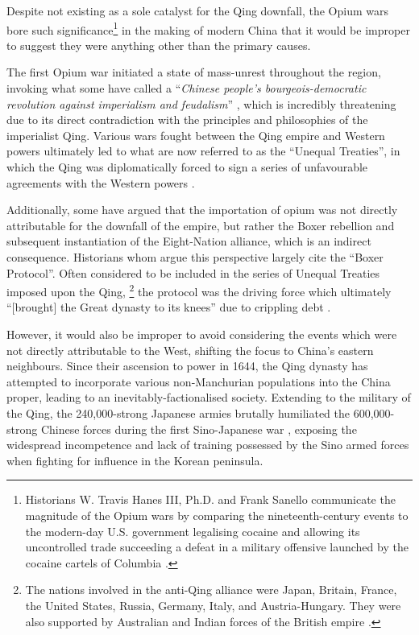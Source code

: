 \documentclass{article}
\begin{document}
Despite not existing as a sole catalyst for the Qing downfall, the Opium wars bore such significance\footnote{Historians W. Travis Hanes III, Ph.D. and Frank Sanello communicate the magnitude of the Opium wars by comparing the nineteenth-century events to the modern-day U.S. government legalising cocaine and allowing its uncontrolled trade succeeding a defeat in a military offensive launched by the cocaine cartels of Columbia
\autocite{Hanes:2004}.} in the making of modern China that it would be improper to suggest they were anything other than the primary causes.

The first Opium war initiated a state of mass-unrest throughout the region, invoking what some have called a ``\textit{Chinese people's bourgeois-democratic revolution against imperialism and feudalism}''
\autocite{Janin:1999}, which is incredibly threatening due to its direct contradiction with the principles and philosophies of the imperialist Qing. Various wars fought between the Qing empire and Western powers ultimately led to what are now referred to as the ``Unequal Treaties'', in which the Qing was diplomatically forced to sign a series of unfavourable agreements with the Western powers \autocite{Wang:2005}.

Additionally, some have argued that the importation of opium was not directly attributable for the downfall of the empire, but rather the Boxer rebellion and subsequent instantiation of the Eight-Nation alliance, which is an indirect consequence. Historians whom argue this perspective largely cite the ``Boxer Protocol''. Often considered to be included in the series of Unequal Treaties imposed upon the Qing, \footnote{The nations involved in the anti-Qing alliance were Japan, Britain, France, the United States, Russia, Germany, Italy, and Austria-Hungary. They were also supported by Australian and Indian forces of the British empire
\autocite{Gardener:2016}.} the protocol was the driving force which ultimately ``[brought] the Great dynasty to its knees'' due to crippling debt \autocite{Mitchell:2008}.

However, it would also be improper to avoid considering the events which were not directly attributable to the West, shifting the focus to China's eastern neighbours. Since their ascension to power in 1644, the Qing dynasty has attempted to incorporate various non-Manchurian populations into the China proper, leading to an inevitably-factionalised society. Extending to the military of the Qing, the 240,000-strong Japanese armies brutally humiliated the 600,000-strong Chinese forces during the first Sino-Japanese war
\autocite{Fenby:2013}, exposing the widespread incompetence and lack of training possessed by the Sino armed forces
\autocite{Jowett:2013} when fighting for influence in the Korean peninsula.
\end{document}
